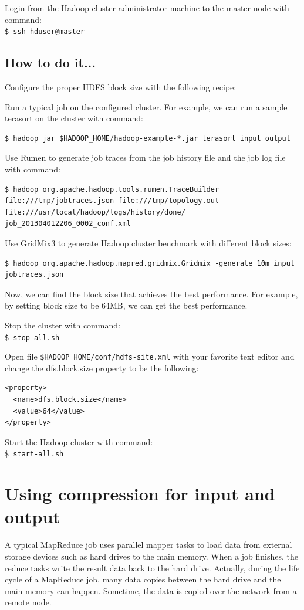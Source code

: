 Login from the Hadoop cluster administrator machine to the master node with command: \\
\verb|$ ssh hduser@master|
\subsection*{How to do it...}
Configure the proper HDFS block size with the following recipe:

Run a typical job on the configured cluster. For example, we can run a sample terasort on the cluster with command:
\lstset{style=bashstyle}
\begin{lstlisting}
$ hadoop jar $HADOOP_HOME/hadoop-example-*.jar terasort input output
\end{lstlisting}

Use Rumen to generate job traces from the job history file and the job log file with command:
\lstset{style=bashstyle}
\begin{lstlisting}
$ hadoop org.apache.hadoop.tools.rumen.TraceBuilder file:///tmp/jobtraces.json file:///tmp/topology.out file:///usr/local/hadoop/logs/history/done/ job_201304012206_0002_conf.xml
\end{lstlisting}

Use GridMix3 to generate Hadoop cluster benchmark with different block sizes:
\lstset{style=bashstyle}
\begin{lstlisting}
$ hadoop org.apache.hadoop.mapred.gridmix.Gridmix -generate 10m input jobtraces.json
\end{lstlisting}

Now, we can find the block size that achieves the best performance. For example, by setting block size to be 64MB, we can get the best performance.

Stop the cluster with command: \\
\verb|$ stop-all.sh|

Open file \verb|$HADOOP_HOME/conf/hdfs-site.xml| with your favorite text editor and change the dfs.block.size property to be the following:
\lstset{style=bashstyle}
\begin{lstlisting}
<property>
  <name>dfs.block.size</name>
  <value>64</value>
</property>
\end{lstlisting}

Start the Hadoop cluster with command:\\
\verb|$ start-all.sh|

\section{Using compression for input and output}
A typical MapReduce job uses parallel mapper tasks to load data from external storage devices such as hard drives to the main memory. When a job finishes, the reduce tasks write the result data back to the hard drive. Actually, during the life cycle of a MapReduce job, many data copies between the hard drive and the main memory can happen. Sometime, the data is copied over the network from a remote node.

